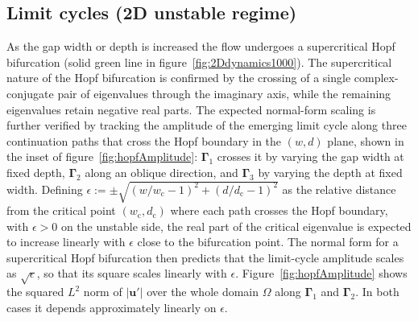\documentclass[lineno]{jfm}
\begin{document}
\subsection{Limit cycles (2D unstable regime)}\label{sec:bifurcations}
As the gap width or depth is increased the flow undergoes a supercritical Hopf bifurcation (solid green line in figure~\ref{fig:2Ddynamics1000}). The supercritical nature of the Hopf bifurcation is confirmed by the crossing of a single complex-conjugate pair of eigenvalues through the imaginary axis, while the remaining eigenvalues retain negative real parts. The expected normal-form scaling is further verified by tracking the amplitude of the emerging limit cycle along three continuation paths that cross the Hopf boundary in the $(w,d)$ plane, shown in the inset of figure~\ref{fig:hopfAmplitude}: $\boldsymbol{\Gamma}_1$ crosses it by varying the gap width at fixed depth, $\boldsymbol{\Gamma}_2$ along an oblique direction, and $\boldsymbol{\Gamma}_3$ by varying the depth at fixed width. Defining $\epsilon:=\pm\sqrt{(w/w_\mathrm{c}-1)^2+(d/d_\mathrm{c}-1)^2}$ as the relative distance from the critical point $(w_\mathrm{c},d_\mathrm{c})$ where each path crosses the Hopf boundary, with $\epsilon>0$ on the unstable side, the real part of the critical eigenvalue is expected to increase linearly with $\epsilon$ close to the bifurcation point. The normal form for a supercritical Hopf bifurcation then predicts that the limit-cycle amplitude scales as $\sqrt{\epsilon}$, so that its square scales linearly with $\epsilon$. Figure~\ref{fig:hopfAmplitude} shows the squared $L^2$ norm of $|\boldsymbol{u}'|$ over the whole domain $\Omega$ along $\boldsymbol{\Gamma}_1$ and $\boldsymbol{\Gamma}_2$. In both cases it depends approximately linearly on $\epsilon$.
\end{document}
